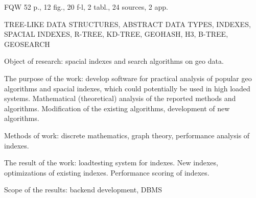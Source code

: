\ReferatEN

FQW 52 p., 12 fig., 20 f-l, 2 tabl., 24 sources, 2 app.

\noindent TREE-LIKE DATA STRUCTURES, ABSTRACT DATA TYPES, INDEXES, SPACIAL INDEXES, R-TREE, KD-TREE, GEOHASH, H3, B-TREE, GEOSEARCH


Object of research: spacial indexes and search algorithms on geo data.

The purpose of the work: develop software for practical analysis of popular geo algorithms and spacial indexes, which could potentially be used in high loaded systems. Mathematical (theoretical) analysis of the reported methods and algorithms. Modification of the existing algorithms, development of new algorithms. 

Methods of work: discrete mathematics, graph theory, performance analysis of indexes.

The result of the work: loadtesting system for indexes. New indexes, optimizations of existing indexes. Performance scoring of indexes.

Scope of the results: backend development, DBMS



